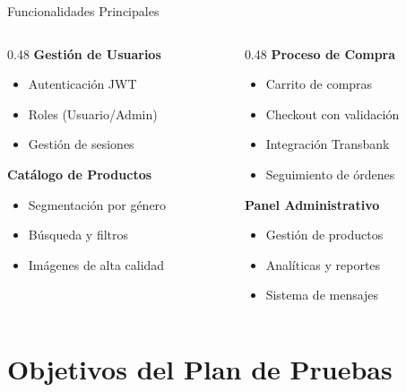 \documentclass[aspectratio=169]{beamer}
\begin{document}
\begin{frame}{Funcionalidades Principales}
\begin{columns}[T]
\begin{column}{0.48\textwidth}
\textbf{Gestión de Usuarios}
\begin{itemize}
    \item Autenticación JWT
    \item Roles (Usuario/Admin)
    \item Gestión de sesiones
\end{itemize}

\vspace{0.3cm}

\textbf{Catálogo de Productos}
\begin{itemize}
    \item Segmentación por género
    \item Búsqueda y filtros
    \item Imágenes de alta calidad
\end{itemize}
\end{column}

\begin{column}{0.48\textwidth}
\textbf{Proceso de Compra}
\begin{itemize}
    \item Carrito de compras
    \item Checkout con validación
    \item Integración Transbank
    \item Seguimiento de órdenes
\end{itemize}

\vspace{0.3cm}

\textbf{Panel Administrativo}
\begin{itemize}
    \item Gestión de productos
    \item Analíticas y reportes
    \item Sistema de mensajes
\end{itemize}
\end{column}
\end{columns}
\end{frame}

\section{Objetivos del Plan de Pruebas}
\end{document}
